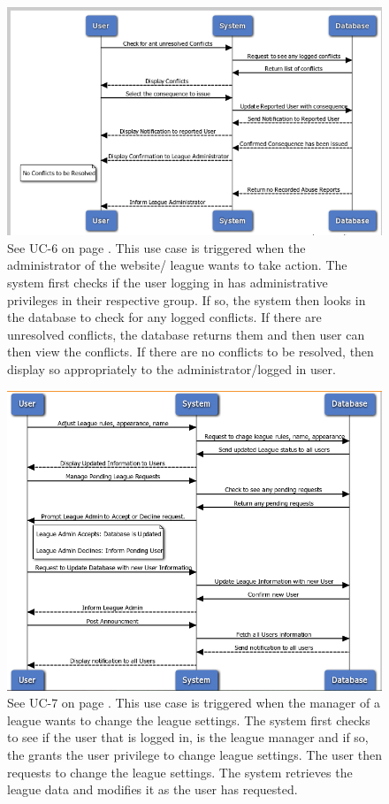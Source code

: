 \begin{figure}
\centering
\includegraphics[width=5.5in]{./img/uc6.png}
\caption{See UC-6 on page \pageref{UC-6}. This use case is triggered when the
administrator of the website/ league wants
to take action. The system first checks if the user logging in has administrative
privileges in their respective group. If so, the system then looks in the database
to check for any logged conflicts. If there are unresolved conflicts, the database
returns them and then user can then view the conflicts. If there are no conflicts to
be resolved, then display so appropriately to the administrator/logged in user.}
\end{figure}

\begin{figure}
\centering
\includegraphics[width=5.5in]{./img/uc7.png}
\caption{See UC-7 on page \pageref{UC-7}. This use case is triggered when the
manager of a league wants to change the league
settings. The system first checks to see if the user that is logged in, is the league
manager and if so, the grants the user privilege to change league settings. The user
then requests to change the league settings. The system retrieves the league data
and modifies it as the user has requested.}
\end{figure}

